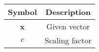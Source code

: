 \begin{tabular}[12pt]{ |c|c|}
    \hline
    \textbf{Symbol} & \textbf{Description} \\
    \hline
    \textbf{x} & Given vector\\
    \hline 
    $c$ & Scaling factor\\
    \hline
    \end{tabular}
